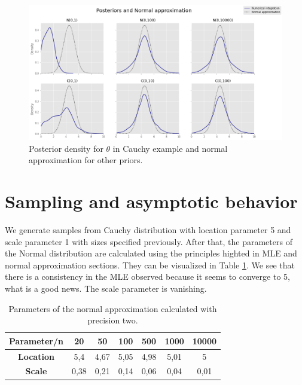 \documentclass[a4paper,10pt, notitlepage]{report}
\theoremstyle{plain}
\begin{document}
\begin{figure}[H]
    \centering
    \includegraphics[width=.85\textwidth]{../../images/comparison-other-cases.png}
    \caption{Posterior density for $\theta$ in Cauchy example and normal approximation for other priors.}
    \label{fig:comparison-normal-posteriori-other}
\end{figure}

\section*{Sampling and asymptotic behavior}

We generate samples from Cauchy distribution with location parameter 5 and
scale parameter 1 with sizes specified previously. After that, the parameters of
the Normal distribution are calculated using the principles highted in MLE and
normal approximation sections. They can be visualized in Table
\ref{tb:approximation-normal-sizes}. We see that there is a consistency in the
MLE observed because it seems to converge to 5, what is a good news. The scale
parameter is vanishing. 

\begin{table}[ht]
    \centering
    \begin{tabular}{|c|c|c|c|c|c|c|}
    \hline
    \textbf{Parameter/n} & \textbf{20} & \textbf{50} & \textbf{100} & \textbf{500} & \textbf{1000} & \textbf{10000} \\ \hline
    \textbf{Location}    & 5,4         & 4,67        & 5,05         & 4,98         & 5,01          & 5              \\ \hline
    \textbf{Scale}       & 0,38        & 0,21        & 0,14          & 0,06         & 0,04        & 0,01          \\ \hline
    \end{tabular}
    \caption{Parameters of the normal approximation calculated with precision two.}
    \label{tb:approximation-normal-sizes}
\end{table}
\end{document}
